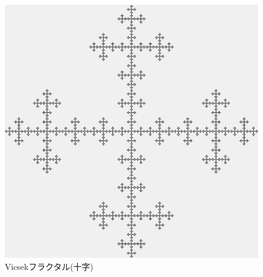 \documentclass[dvipdfmx]{jsarticle}
\theoremstyle{definition}
\begin{document}
\begin{figure}[ht]
\begin{minipage}{0.49\hsize}
\begin{center}
        \includegraphics[scale=0.20]{figure/vicsek_fractal_cross.png}
    \end{center}
    \caption{Vicsekフラクタル(十字)}
    \label{pic_vicfr_c}
\end{minipage}
\end{figure}
\end{document}

